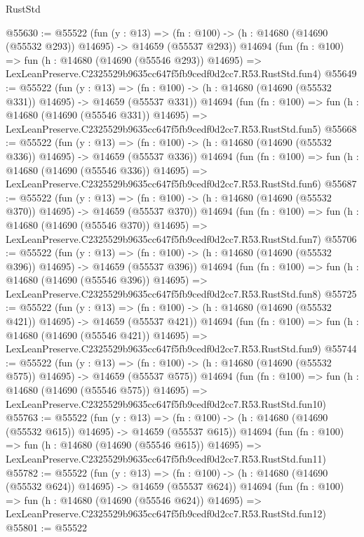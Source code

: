 \begin{lexlean}{RustStd}
\begin{coremodule}
@55630 := @55522
    (fun (y : @13) =>
    (fn : @100) -> (h : @14680 (@14690 (@55532 @293)) @14695) -> @14659 (@55537 @293))
    @14694
    (fun (fn : @100) =>
    fun (h : @14680 (@14690 (@55546 @293)) @14695) =>
    LexLeanPreserve.C2325529b9635cc647f5fb9cedf0d2cc7.R53.RustStd.fun4)
@55649 := @55522
    (fun (y : @13) =>
    (fn : @100) -> (h : @14680 (@14690 (@55532 @331)) @14695) -> @14659 (@55537 @331))
    @14694
    (fun (fn : @100) =>
    fun (h : @14680 (@14690 (@55546 @331)) @14695) =>
    LexLeanPreserve.C2325529b9635cc647f5fb9cedf0d2cc7.R53.RustStd.fun5)
@55668 := @55522
    (fun (y : @13) =>
    (fn : @100) -> (h : @14680 (@14690 (@55532 @336)) @14695) -> @14659 (@55537 @336))
    @14694
    (fun (fn : @100) =>
    fun (h : @14680 (@14690 (@55546 @336)) @14695) =>
    LexLeanPreserve.C2325529b9635cc647f5fb9cedf0d2cc7.R53.RustStd.fun6)
@55687 := @55522
    (fun (y : @13) =>
    (fn : @100) -> (h : @14680 (@14690 (@55532 @370)) @14695) -> @14659 (@55537 @370))
    @14694
    (fun (fn : @100) =>
    fun (h : @14680 (@14690 (@55546 @370)) @14695) =>
    LexLeanPreserve.C2325529b9635cc647f5fb9cedf0d2cc7.R53.RustStd.fun7)
@55706 := @55522
    (fun (y : @13) =>
    (fn : @100) -> (h : @14680 (@14690 (@55532 @396)) @14695) -> @14659 (@55537 @396))
    @14694
    (fun (fn : @100) =>
    fun (h : @14680 (@14690 (@55546 @396)) @14695) =>
    LexLeanPreserve.C2325529b9635cc647f5fb9cedf0d2cc7.R53.RustStd.fun8)
@55725 := @55522
    (fun (y : @13) =>
    (fn : @100) -> (h : @14680 (@14690 (@55532 @421)) @14695) -> @14659 (@55537 @421))
    @14694
    (fun (fn : @100) =>
    fun (h : @14680 (@14690 (@55546 @421)) @14695) =>
    LexLeanPreserve.C2325529b9635cc647f5fb9cedf0d2cc7.R53.RustStd.fun9)
@55744 := @55522
    (fun (y : @13) =>
    (fn : @100) -> (h : @14680 (@14690 (@55532 @575)) @14695) -> @14659 (@55537 @575))
    @14694
    (fun (fn : @100) =>
    fun (h : @14680 (@14690 (@55546 @575)) @14695) =>
    LexLeanPreserve.C2325529b9635cc647f5fb9cedf0d2cc7.R53.RustStd.fun10)
@55763 := @55522
    (fun (y : @13) =>
    (fn : @100) -> (h : @14680 (@14690 (@55532 @615)) @14695) -> @14659 (@55537 @615))
    @14694
    (fun (fn : @100) =>
    fun (h : @14680 (@14690 (@55546 @615)) @14695) =>
    LexLeanPreserve.C2325529b9635cc647f5fb9cedf0d2cc7.R53.RustStd.fun11)
@55782 := @55522
    (fun (y : @13) =>
    (fn : @100) -> (h : @14680 (@14690 (@55532 @624)) @14695) -> @14659 (@55537 @624))
    @14694
    (fun (fn : @100) =>
    fun (h : @14680 (@14690 (@55546 @624)) @14695) =>
    LexLeanPreserve.C2325529b9635cc647f5fb9cedf0d2cc7.R53.RustStd.fun12)
@55801 := @55522

\end{coremodule}
\end{lexlean}

